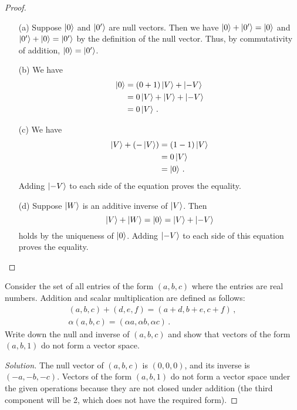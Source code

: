 \begin{proof}
\begin{enumerate}
    \item[(a)] Suppose $\ket{0}$ and $\ket{0'}$ are null vectors. Then we have $\ket{0} + \ket{0'} = \ket{0}$ and $\ket{0'} + \ket{0} = \ket{0'}$ by the definition of the null vector. Thus, by commutativity of addition, $\ket{0} = \ket{0'}$.
        \item[(b)] We have
        \begin{align}
            \ket{0} &= (0 + 1)\ket{V} + \ket{-V} \\
            &= 0\ket{V} + \ket{V} + \ket{-V} \\
            &= 0\ket{V}\,.
        \end{align}
        \item[(c)] We have
        \begin{align}
        \ket{V} + (-\ket{V}) &= (1 - 1)\ket{V} \\
        &= 0\ket{V} \\
        &= \ket{0}\,.
        \end{align}
        Adding $\ket{-V}$ to each side of the equation proves the equality.
        \item[(d)] Suppose $\ket{W}$ is an additive inverse of $\ket{V}$. Then
        \[\ket{V} + \ket{W} = \ket{0} = \ket{V} + \ket{-V}\] holds by the uniqueness of $\ket{0}$. Adding $\ket{-V}$ to each side of this equation proves the equality.
\end{enumerate}
\end{proof}

\begin{exercise}
Consider the set of all entries of the form $(a,b,c)$ where the entries are real numbers. Addition and scalar multiplication are defined as follows:
\begin{gather}
    (a, b, c) + (d, e, f) = (a + d, b + e, c + f)\,, \\
    \alpha(a, b, c) = (\alpha a, \alpha b, \alpha c)\,.
\end{gather}
Write down the null and inverse of $(a, b, c)$ and show that vectors of the form $(a, b, 1)$ do not form a vector space.
\end{exercise}

\begin{proof}[Solution]
    The null vector of $(a, b, c)$ is $(0, 0, 0)$, and its inverse is $(-a, -b, -c)$. Vectors of the form $(a, b, 1)$ do not form a vector space under the given operations because they are not closed under addition (the third component will be 2, which does not have the required form).
\end{proof}


